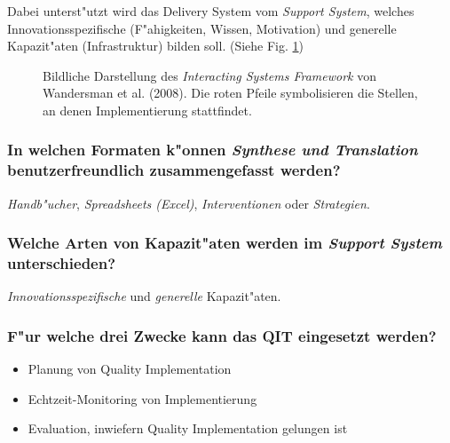 \noindent Dabei unterst"utzt wird das Delivery System vom \emph{Support System}, welches Innovationsspezifische (F"ahigkeiten, Wissen, Motivation) und generelle Kapazit"aten (Infrastruktur) bilden soll. (Siehe Fig. \ref{fig:meyers1})
\begin{figure}[hb!]
        \begin{center}
        \end{center}
        \caption{Bildliche Darstellung des \emph{Interacting Systems Framework} von Wandersman et al. (2008). Die roten Pfeile symbolisieren die Stellen, an denen Implementierung stattfindet.}
        \label{fig:meyers1}
\end{figure}

\subsubsection{In welchen Formaten k"onnen \emph{Synthese und Translation} benutzerfreundlich zusammengefasst werden?}
\emph{Handb"ucher}, \emph{Spreadsheets (Excel)}, \emph{Interventionen} oder \emph{Strategien}.

\subsubsection{Welche Arten von Kapazit"aten werden im \emph{Support System} unterschieden?}
\emph{Innovationsspezifische} und \emph{generelle} Kapazit"aten.

\subsubsection{F"ur welche drei Zwecke kann das QIT eingesetzt werden?}
\begin{itemize}
        \item Planung von Quality Implementation
        \item Echtzeit-Monitoring von Implementierung
        \item Evaluation, inwiefern Quality Implementation gelungen ist
\end{itemize}

